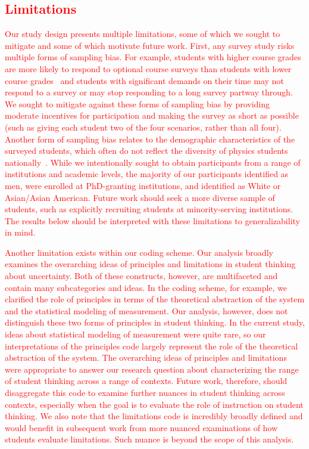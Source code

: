 \documentclass[english,aps,prstper,reprint,showpacs,longbibliography,superscriptaddress,nofootinbib]{revtex4-2}
\begin{document}
\subsection{\textcolor{red}{Limitations}}

{\textcolor{red}{Our study design presents multiple limitations, some of which we sought to mitigate and some of which motivate future work. First, any survey study risks multiple forms of sampling bias. For example, students with higher course grades are more likely to respond to optional course surveys than students with lower course grades~\cite{Nissen2019} and students with significant demands on their time may not respond to a survey or may stop responding to a long survey partway through. We sought to mitigate against these forms of sampling bias by providing moderate incentives for participation and making the survey as short as possible (such as giving each student two of the four scenarios, rather than all four). Another form of sampling bias relates to the demographic characteristics of the surveyed students, which often do not reflect the diversity of physics students nationally~\cite{Kanim2020}. While we intentionally sought to obtain participants from a range of institutions and academic levels, the majority of our participants identified as men, were enrolled at PhD-granting institutions, and identified as White or Asian/Asian American. Future work should seek a more diverse sample of students, such as explicitly recruiting students at minority-serving institutions. The results below should be interpreted with these limitations to generalizability in mind.}}

{\textcolor{red}{Another limitation exists within our coding scheme. Our analysis broadly examines the overarching ideas of principles and limitations in student thinking about uncertainty. Both of these constructs, however, are multifaceted and contain many subcategories and ideas. In the coding scheme, for example, we clarified the role of principles in terms of the theoretical abstraction of the system and the statistical modeling of measurement. Our analysis, however, does not distinguish these two forms of principles in student thinking. In the current study, ideas about statistical modeling of measurement were quite rare, so our interpretations of the principles code largely represent the role of the theoretical abstraction of the system. The overarching ideas of principles and limitations were appropriate to answer our research question about characterizing the range of student thinking across a range of contexts. Future work, therefore, should disaggregate this code to examine further nuances in student thinking across contexts, especially when the goal is to evaluate the role of instruction on student thinking. We also note that the limitations code is incredibly broadly defined and would benefit in subsequent work from more nuanced examinations of how students evaluate limitations. Such nuance is beyond the scope of this analysis. }}
\end{document}
